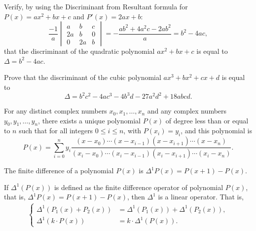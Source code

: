 \begin{corollary}
    Verify, by using the Discriminant from Resultant formula for $P(x)=ax^2+bx+c$ and $P'(x)=2ax+b$:
    \[\frac{-1}{a}\begin{vmatrix}
        a & b & c\\
        2a & b & 0\\
        0 & 2a & b
    \end{vmatrix} = -\frac{ab^2+4a^2c-2ab^2}{a}=b^2-4ac,\]
    that the discriminant of the quadratic polynomial $ax^2+bx+c$ is equal to $\Delta=b^2-4ac$.
\end{corollary}


\begin{corollary}
    Prove that the discriminant of the cubic polynomial $ax^3+bx^2+cx+d$ is equal to \[\Delta=b^{2}c^{2}-4ac^{3}-4b^{3}d-27a^{2}d^{2}+18abcd.\]
\end{corollary}


\begin{theorem}
    For any distinct complex numbers $x_0, x_1, \dots, x_n$ and any complex numbers $y_0, y_1, \dots, y_n$, there exists a unique polynomial $P(x)$ of degree less than or equal to $n$ such that for all integers $0 \leq i \leq n$, with $P(x_i) = y_i$, and this polynomial is
    \[P(x) = \sum_{i=0}^{n}y_i \frac{(x-x_0) \cdots (x-x_{i-1}) (x-x_{i+1}) \cdots (x-x_n)}{(x_i-x_0) \cdots (x_i-x_{i-1}) (x_i - x_{i+1}) \cdots (x_i - x_n)}.\]
\end{theorem}


\begin{definition}
    The finite difference of a polynomial $P(x)$ is $\Delta^1 P(x) = P(x + 1) - P(x)$.
\end{definition}

\begin{theorem}
    If $\Delta^1(P(x))$ is defined as the finite difference operator of polynomial $P(x)$, that is, $\Delta^1 P(x) = P(x + 1) - P(x)$, then $\Delta^1$ is a linear operator. That is,
    \begin{align*}
        \begin{cases}
            \Delta^1\left(P_1(x)+P_2(x)\right) &= \Delta^1\left(P_1(x)\right)+\Delta^1\left(P_2(x)\right),\\
            \Delta^1\left(k\cdot P(x)\right) &= k\cdot \Delta^1\left(P(x)\right).
        \end{cases}
    \end{align*}
\end{theorem}



